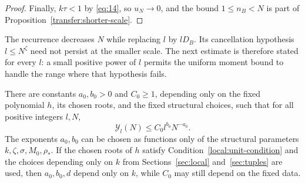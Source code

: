 \begin{proof}
Finally, $k\tau<1$ by \eqref{eq:14}, so $u_N\to0$, and the bound
$1\le n_B<N$ is part of Proposition~\ref{transfer:shorter-scale}.
\end{proof}

The recurrence decreases $N$ while replacing $l$ by $lD_B$.  Its
cancellation hypothesis $l\le N^\zeta$ need not persist at the smaller
scale.  The next estimate is therefore stated for every $l$: a small
positive power of $l$ permits the uniform moment bound to handle the range
where that hypothesis fails.

\begin{proposition}
\label{induction:decay}
There are constants $a_0,b_0>0$ and $C_0\ge1$, depending only on the fixed
polynomial $h$, its chosen roots, and the fixed structural choices, such that
for all positive integers $l,N$,
\begin{equation}
 \mathcal Y_l(N)\le C_0l^{b_0}N^{-a_0}.
 \label{eq:33}
\end{equation}
The exponents $a_0,b_0$ can be chosen as functions only of the structural
parameters $k,\zeta,\sigma,M_0,\rho_*$.  If the chosen roots of $h$
satisfy Condition~\eqref{local:unit-condition} and the choices depending
only on $k$ from Sections~\ref{sec:local} and~\ref{sec:tuples} are used, then
$a_0,b_0,d$ depend only on $k$, while $C_0$ may still depend on the fixed data.
\end{proposition}

